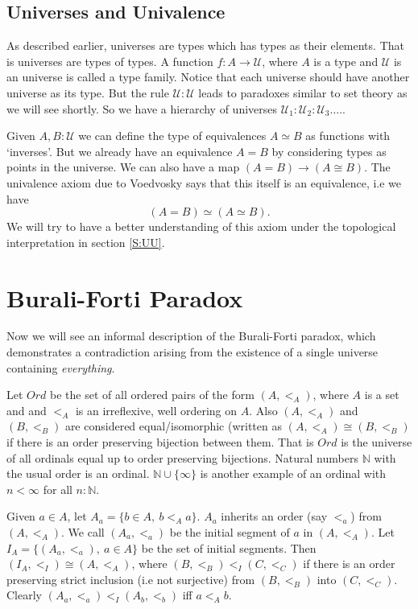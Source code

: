 \documentclass[10pt]{article}
\theoremstyle{definition}
\theoremstyle{plain}
\theoremstyle{remark}
\newcommand{\U}{\mathscr{U}}
\begin{document}
\subsection{Universes and Univalence}

As described earlier, universes are types which has types as their elements. That is universes
are types of types. A function $f : A \to \U$, where $A$ is a type and $\U$ is an universe
is called a type family. Notice that each universe should have another universe as its type.
But the rule $\U : \U$ leads to paradoxes similar to set theory as we will see shortly. 
So we have a hierarchy of universes $\U_1 : \U_2 : \U_3 \dots $.\smallskip.

Given $A, B:\U$ we can define the type of equivalences $A\simeq B$ as functions
with `inverses'. But we already have an equivalence $A = B$ by considering types as points
in the universe. We can also have a map $(A = B) \to (A \cong B)$. The univalence axiom 
due to Voedvosky says that this itself is an equivalence, i.e we have
\[ (A = B) \simeq (A \simeq B).\]
We will try to have a better understanding of this axiom under the topological interpretation
in section \ref{S:UU}.

\section{Burali-Forti Paradox}\label{S:BFP}

Now we will see an informal description of the Burali-Forti paradox, which demonstrates a
contradiction arising from the existence of a single universe containing 
\emph{everything}.\smallskip

Let $Ord$ be the set of all ordered pairs of the form $(A, <_A)$, where $A$ is a set and
and $<_A$ is an irreflexive, well ordering on $A$. Also $(A, <_A)$ and $(B, <_B)$ are 
considered equal/isomorphic (written as $(A,<_A) \cong (B,<_B)$ if there is an order 
preserving bijection between them. That is $Ord$ is the universe of all ordinals equal up to 
order preserving bijections. Natural numbers $\mathbb{N}$ with the usual order is an ordinal.
$\mathbb{N}\cup \{\infty \}$ is another example of an ordinal with $n < \infty$ for all
$n : \mathbb{N}$.\smallskip

Given $a\in A$, let $A_a = \{b \in A,\ b <_A a \}$. $A_a$ inherits an order (say $<_a$)
from $(A, <_A)$. We call $(A_a, <_a)$ be the initial segment of $a$ in $(A, <_A)$. Let
$I_A = \{(A_a, <_a),\ a\in A\}$ be the set of initial segments. Then 
$(I_A,<_I) \cong (A, <_A)$, where ${ (B,<_B) <_I (C,<_C) }$ if there is an order preserving 
strict inclusion (i.e not surjective) from $(B,<_B)$ into $(C,<_C)$. Clearly 
$(A_a,<_a) <_I (A_b,<_b)$ iff $a <_A b$.\smallskip
\end{document}
